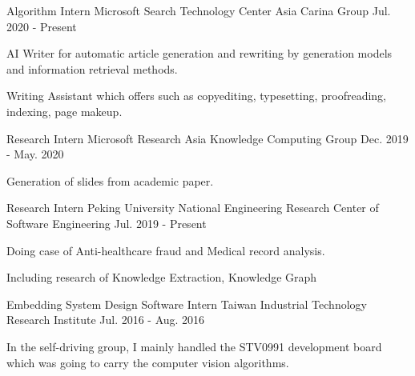 

\begin{cventries}

  \cventry
    {Algorithm Intern} %
    {Microsoft Search Technology Center Asia Carina Group} %
    {} %
    {Jul. 2020 - Present} %
    {
      \begin{cvitems} %
        \item {AI Writer for automatic article generation and rewriting by generation models and information retrieval methods.}
        \item {Writing Assistant which offers such as copyediting, typesetting, proofreading, indexing, page makeup.}
      \end{cvitems}
    }

  \cventry
    {Research Intern} %
    {Microsoft Research Asia Knowledge Computing Group} %
    {} %
    {Dec. 2019 - May. 2020} %
    {
      \begin{cvitems} %
        \item {Generation of slides from academic paper.}
      \end{cvitems}
    }

  \cventry
    {Research Intern} %
    {Peking University National Engineering Research Center of Software Engineering} %
    {} %
    {Jul. 2019 - Present} %
    {
      \begin{cvitems} %
        \item {Doing case of Anti-healthcare fraud and Medical record analysis.}
        \item {Including research of Knowledge Extraction, Knowledge Graph}
      \end{cvitems}
    }

  \cventry
    {Embedding System Design Software Intern} %
    {Taiwan Industrial Technology Research Institute} %
    {} %
    {Jul. 2016 - Aug. 2016} %
    {
      \begin{cvitems} %
        \item {In the self-driving group, I mainly handled the STV0991 development board which was going to carry the computer vision algorithms.}
      \end{cvitems}
    }

\end{cventries}
